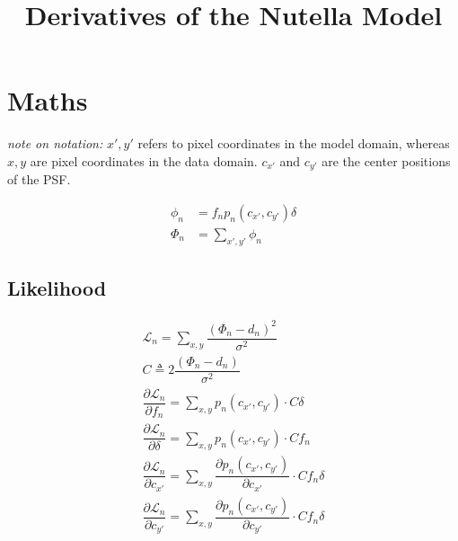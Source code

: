 \documentclass{article}
\title{Derivatives of the Nutella Model}
\begin{document}
\maketitle

\section{Maths}
\textit{note on notation:} $x', y'$ refers to pixel coordinates in the model domain, whereas $x, y$ are pixel coordinates in the data domain.
$c_{x'}$ and $c_{y'}$ are the center positions of the PSF.

\begin{align}
    \phi_n &= f_n p_n(c_{x'}, c_{y'}) \delta\\
    \Phi_n &= \sum_{x', y'} \phi_n
\end{align}

\subsection{Likelihood}

\begin{align}
    \mathcal{L}_n = \sum_{x, y} \dfrac{\left(\Phi_n - d_n\right) ^ 2}{\sigma^2}\\
    C \triangleq 2 \dfrac{\left(\Phi_n - d_n\right)}{\sigma^2}\\
    \dfrac{\partial\mathcal{L}_n}{\partial f_n} = \sum_{x, y} p_n(c_{x'}, c_{y'}) \cdot C\delta  \\
    \dfrac{\partial\mathcal{L}_n}{\partial \delta} = \sum_{x, y} p_n(c_{x'}, c_{y'}) \cdot C f_n  \\
    \dfrac{\partial\mathcal{L}_n}{\partial c_{x'}} = \sum_{x, y} \dfrac{\partial p_n(c_{x'}, c_{y'})}{\partial c_{x'}} \cdot C f_n \delta \\
    \dfrac{\partial\mathcal{L}_n}{\partial c_{y'}} = \sum_{x, y} \dfrac{\partial p_n(c_{x'}, c_{y'})}{\partial c_{y'}} \cdot C f_n \delta
\end{align}
\end{document}
